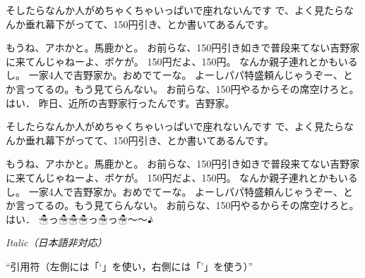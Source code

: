 \documentclass[twocolumn, lualatex, ja=standard]{bxjsarticle}
\begin{document}
そしたらなんか人がめちゃくちゃいっぱいで座れないんです
で、よく見たらなんか垂れ幕下がってて、150円引き、とか書いてあるんです。

もうね、アホかと。馬鹿かと。
お前らな、150円引き如きで普段来てない吉野家に来てんじゃねーよ、ボケが。
150円だよ、150円。
なんか親子連れとかもいるし。
一家4人で吉野家か。おめでてーな。
よーしパパ特盛頼んじゃうぞー、とか言ってるの。もう見てらんない。
お前らな、150円やるからその席空けろと。はい．
昨日、近所の吉野家行ったんです。吉野家。

そしたらなんか人がめちゃくちゃいっぱいで座れないんです
で、よく見たらなんか垂れ幕下がってて、150円引き、とか書いてあるんです。

もうね、アホかと。馬鹿かと。
お前らな、150円引き如きで普段来てない吉野家に来てんじゃねーよ、ボケが。
150円だよ、150円。
なんか親子連れとかもいるし。
一家4人で吉野家か。おめでてーな。
よーしパパ特盛頼んじゃうぞー、とか言ってるの。もう見てらんない。
お前らな、150円やるからその席空けろと。はい．
☃っ☃☃☃っ☃っ☃～～♪

\textit{Italic（日本語非対応）}

``引用符（左側には「`」を使い，右側には「'」を使う）''
\end{document}
